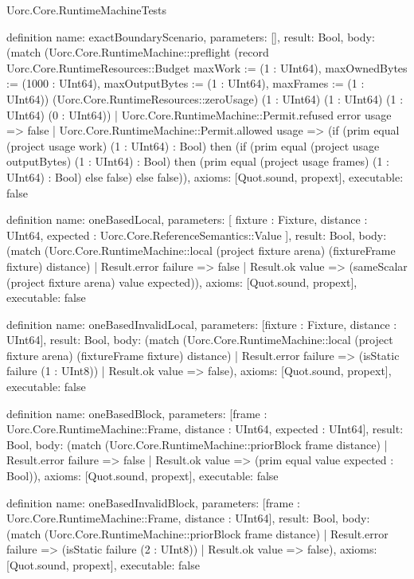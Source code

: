 \begin{lexlean}{Uorc.Core.RuntimeMachineTests}
\begin{semanticmodule}
definition{
  name: exactBoundaryScenario,
  parameters: [],
  result: Bool,
  body: (match (Uorc.Core.RuntimeMachine::preflight (record Uorc.Core.RuntimeResources::Budget {maxWork := (1 : UInt64), maxOwnedBytes := (1000 : UInt64), maxOutputBytes := (1 : UInt64), maxFrames := (1 : UInt64)}) (Uorc.Core.RuntimeResources::zeroUsage) (1 : UInt64) (1 : UInt64) (1 : UInt64) (0 : UInt64))
    | Uorc.Core.RuntimeMachine::Permit.refused error usage => false
    | Uorc.Core.RuntimeMachine::Permit.allowed usage => (if (prim equal (project usage work) (1 : UInt64) : Bool) then (if (prim equal (project usage outputBytes) (1 : UInt64) : Bool) then (prim equal (project usage frames) (1 : UInt64) : Bool) else false) else false)),
  axioms: [Quot.sound, propext],
  executable: false
}

definition{
  name: oneBasedLocal,
  parameters: [
    fixture : Fixture,
    distance : UInt64,
    expected : Uorc.Core.ReferenceSemantics::Value
  ],
  result: Bool,
  body: (match (Uorc.Core.RuntimeMachine::local (project fixture arena) (fixtureFrame fixture) distance)
    | Result.error failure => false
    | Result.ok value => (sameScalar (project fixture arena) value expected)),
  axioms: [Quot.sound, propext],
  executable: false
}

definition{
  name: oneBasedInvalidLocal,
  parameters: [fixture : Fixture, distance : UInt64],
  result: Bool,
  body: (match (Uorc.Core.RuntimeMachine::local (project fixture arena) (fixtureFrame fixture) distance)
    | Result.error failure => (isStatic failure (1 : UInt8))
    | Result.ok value => false),
  axioms: [Quot.sound, propext],
  executable: false
}

definition{
  name: oneBasedBlock,
  parameters: [frame : Uorc.Core.RuntimeMachine::Frame, distance : UInt64, expected : UInt64],
  result: Bool,
  body: (match (Uorc.Core.RuntimeMachine::priorBlock frame distance)
    | Result.error failure => false
    | Result.ok value => (prim equal value expected : Bool)),
  axioms: [Quot.sound, propext],
  executable: false
}

definition{
  name: oneBasedInvalidBlock,
  parameters: [frame : Uorc.Core.RuntimeMachine::Frame, distance : UInt64],
  result: Bool,
  body: (match (Uorc.Core.RuntimeMachine::priorBlock frame distance)
    | Result.error failure => (isStatic failure (2 : UInt8))
    | Result.ok value => false),
  axioms: [Quot.sound, propext],
  executable: false
}


\end{semanticmodule}
\end{lexlean}
